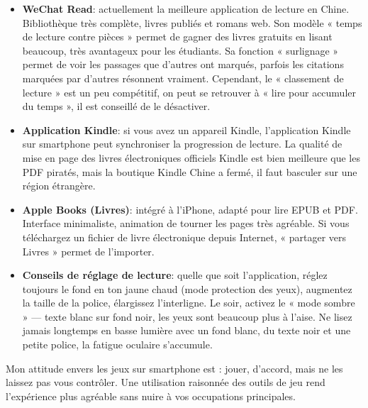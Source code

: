 \begin{itemize}
  \item \textbf{WeChat Read}: actuellement la meilleure application de lecture en Chine. Bibliothèque très complète, livres publiés et romans web. Son modèle « temps de lecture contre pièces » permet de gagner des livres gratuits en lisant beaucoup, très avantageux pour les étudiants. Sa fonction « surlignage » permet de voir les passages que d'autres ont marqués, parfois les citations marquées par d'autres résonnent vraiment. Cependant, le « classement de lecture » est un peu compétitif, on peut se retrouver à « lire pour accumuler du temps », il est conseillé de le désactiver.
  \item \textbf{Application Kindle}: si vous avez un appareil Kindle, l'application Kindle sur smartphone peut synchroniser la progression de lecture. La qualité de mise en page des livres électroniques officiels Kindle est bien meilleure que les PDF piratés, mais la boutique Kindle Chine a fermé, il faut basculer sur une région étrangère.
  \item \textbf{Apple Books (Livres)}: intégré à l'iPhone, adapté pour lire EPUB et PDF. Interface minimaliste, animation de tourner les pages très agréable. Si vous téléchargez un fichier de livre électronique depuis Internet, « partager vers Livres » permet de l'importer.
  \item \textbf{Conseils de réglage de lecture}: quelle que soit l'application, réglez toujours le fond en ton jaune chaud (mode protection des yeux), augmentez la taille de la police, élargissez l'interligne. Le soir, activez le « mode sombre » — texte blanc sur fond noir, les yeux sont beaucoup plus à l'aise. Ne lisez jamais longtemps en basse lumière avec un fond blanc, du texte noir et une petite police, la fatigue oculaire s'accumule.
\end{itemize}


Mon attitude envers les jeux sur smartphone est : jouer, d'accord, mais ne les laissez pas vous contrôler. Une utilisation raisonnée des outils de jeu rend l'expérience plus agréable sans nuire à vos occupations principales.

